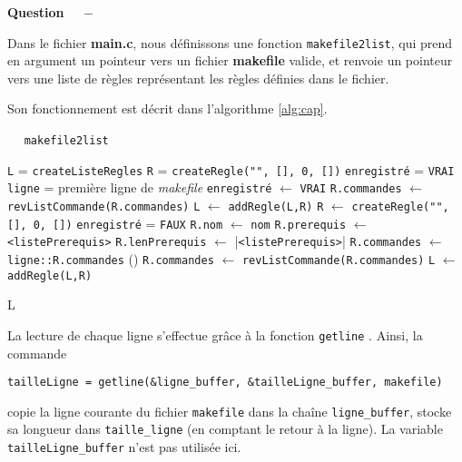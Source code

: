 \documentclass[11pt]{article}
\newcounter{question}[section]
\newenvironment{question}[1][]{\refstepcounter{question}\par\medskip
   \noindent\textbf{Question~\thequestion ~ $-$} \rmfamily}{}
\begin{document}
\begin{question} %

Dans le fichier \textbf{main.c}, nous définissons une fonction \texttt{makefile2list}, qui prend en argument un pointeur vers un fichier \textbf{makefile} valide, et renvoie un pointeur vers une liste de règles représentant les règles définies dans le fichier.

Son fonctionnement est décrit dans l'algorithme \ref{alg:cap}.

\begin{algorithm}[!h]
\caption{ $\quad$ \texttt{makefile2list}}
\label{alg:cap}
\begin{algorithmic}
\State \texttt{L} = \texttt{createListeRegles}
\State \texttt{R} = \texttt{createRegle("", [], 0, [])}
\State \texttt{enregistré} = \texttt{VRAI}
\State \texttt{ligne} = première ligne de \emph{makefile}
	\State \texttt{enregistré} $\gets$ \texttt{VRAI}
	\State \texttt{R.commandes} $\gets$ \texttt{revListCommande(R.commandes)}
	\State \texttt{L} $\gets$ \texttt{addRegle(L,R)}
	\State \texttt{R} $\gets$ \texttt{createRegle("", [], 0, [])}
	\State \texttt{enregistré} = \texttt{FAUX}
	\State \texttt{R.nom} $\gets$ \texttt{nom}
	\State \texttt{R.prerequis} $\gets$ \texttt{<listePrerequis>}
	\State \texttt{R.lenPrerequis} $\gets$ |\texttt{<listePrerequis>}|
	\State \texttt{R.commandes} $\gets$ \texttt{ligne::R.commandes}
\Else {}
    \State ()
\EndIf
\EndWhile
{}
	\State \texttt{R.commandes} $\gets$ \texttt{revListCommande(R.commandes)}
	\State \texttt{L} $\gets$ \texttt{addRegle(L,R)}
\EndIf

\Return L
\end{algorithmic}
\end{algorithm}




La lecture de chaque ligne s'effectue grâce à la fonction \texttt{getline} \cite{getline}. Ainsi, la commande \begin{center}
\texttt{tailleLigne = getline(\&ligne\_buffer, \&tailleLigne\_buffer, makefile)}
\end{center}
copie la ligne courante du fichier \texttt{makefile} dans la chaîne \texttt{ligne\_buffer}, stocke sa longueur dans \texttt{taille\_ligne} (en comptant le retour à la ligne). La variable \texttt{tailleLigne\_buffer} n'est pas utilisée ici.



\end{question}
\end{document}
